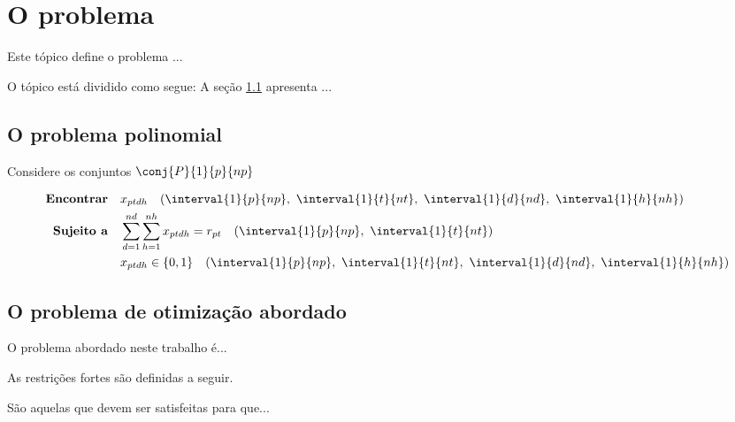 \chapter{O problema}
\label{sec:PHE}


Este tópico define o problema ...

O tópico está dividido como segue: A seção \ref{sec:PHEpolinomial} apresenta ... 

\section{O problema polinomial}
\label{sec:PHEpolinomial}

Considere os conjuntos $\conj{P}{1}{p}{np}$

\begin{align}
	\textbf{Encontrar} \quad & x_{ptdh} \quad (\interval{1}{p}{np}, ~\interval{1}{t}{nt}, ~\interval{1}{d}{nd}, 				~\interval{1}{h}{nh}) \nonumber \\
	\label{eq:H1_poli}
	\textbf{Sujeito a} \quad & \sum _{d=1}^{nd} \sum _{h=1}^{nh}x_{ptdh}=r_{pt} \quad (\interval{1}{p}{np}, 					~\interval{1}{t}{nt}) \\
	& x_{ptdh} \in \{0,1\} \quad (\interval{1}{p}{np}, ~\interval{1}{t}{nt}, ~\interval{1}{d}{nd}, ~\interval{1}{h}{nh})
\end{align}


\section{O problema de otimização abordado}
\label{sec:PHEreal}

O problema abordado neste trabalho é...

As restrições fortes são definidas a seguir.

\begin{defi}
\label{def:rest_fortes}
São aquelas que devem ser satisfeitas para que...

\end{defi}